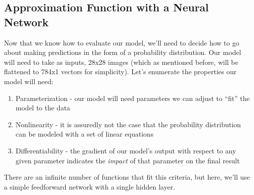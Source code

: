 \subsection{Approximation Function with a Neural
		Network}\label{approximation-function-with-a-neural-network}

Now that we know how to evaluate our model, we'll need to decide how to
go about making predictions in the form of a probability distribution.
Our model will need to take as inputs, 28x28 images (which as mentioned
before, will be flattened to 784x1 vectors for simplicity). Let's
enumerate the properties our model will need:

\begin{enumerate}
	\item
	Parameterization - our model will need parameters we can adjust to
	``fit'' the model to the data
	\item
	Nonlinearity - it is assuredly not the case that the probability
	distribution can be modeled with a set of linear equations
	\item
	Differentiability - the gradient of our model's output with respect to
	any given parameter indicates the \emph{impact} of that parameter on
	the final result
\end{enumerate}

There are an infinite number of functions that fit this criteria, but
here, we'll use a simple feedforward network with a single hidden layer.

